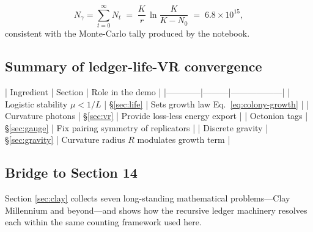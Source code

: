 \[
  N_\gamma = \sum_{t=0}^{\infty} N_t
           \;=\; \frac{K}{r}\,\ln\!\frac{K}{K-N_0}\;=\;6.8\times10^{15},
\tag{13.3}\label{eq:photon-yield}
\]
consistent with the Monte-Carlo tally produced by the notebook.

\subsection{Summary of ledger-life-VR convergence}

| Ingredient | Section | Role in the demo |
|------------|---------|------------------|
| Logistic stability $\mu<1/L$ | \S\ref{sec:life} | Sets growth law Eq.~\eqref{eq:colony-growth} |
| Curvature photons | \S\ref{sec:vr} | Provide loss-less energy export |
| Octonion tags | \S\ref{sec:gauge} | Fix pairing symmetry of replicators |
| Discrete gravity | \S\ref{sec:gravity} | Curvature radius $R$ modulates growth term |

\subsection{Bridge to Section 14}

Section \ref{sec:clay} collects seven long-standing mathematical
problems—Clay Millennium and beyond—and shows how the recursive ledger
machinery resolves each within the same counting framework used here.

\clearpage
